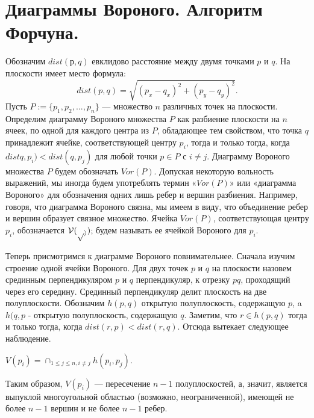 \section{Диаграммы Вороного. Алгоритм Форчуна. }

\begin{definition}
	Обозначим  $dist(р, q)$  евклидово  расстояние  между  двумя  точками $p$ и $q$.
	На  плоскости имеет место формула: $$dist(p, q) = \sqrt{(p_x-q_x)^2+(p_y-q_y)^2}.$$
	Пусть  $P  := \{p_1,  p_2, ..., p_n\}$  ---  множество  $n$  различных  точек  на  плоскости.
	Определим  диаграмму  Вороного  множества  $P$  как разбиение  плоскости  на  $n$  ячеек,  по  одной  для  каждого  центра  из  $P$,  обладающее тем  свойством,  что  точка  $q$  принадлежит  ячейке,  соответствующей  центру  $p_i$,  тогда и  только  тогда,  когда  $distq, p_i)  <  dist(q,  p_j)$  для  любой  точки  $p \in P$ с $i \not= j$.
	Диаграмму Вороного  множества  $P$  будем  обозначать  $Vor(P)$. 
	Допуская  некоторую  вольность выражений,  мы  иногда  будем  употреблять  термин  «$Vor(P)$»  или  «диаграмма  Вороного»  для  обозначения  одних  лишь  ребер  и  вершин  разбиения.
	Например,  говоря, что  диаграмма  Вороного  связна,  мы  имеем  в  виду,  что  объединение  ребер  и  вершин образует  связное  множество. 
	Ячейка  $Vor(P)$,  соответствующая  центру  $p_i$,  обозначается  $\cal V(p_i)$;  будем  называть  ее  ячейкой  Вороного  для  $p_i$.
\end{definition}

Теперь  присмотримся  к  диаграмме  Вороного  повнимательнее. 
Сначала  изучим строение  одной  ячейки  Вороного. 
Для  двух  точек  $p$  и  $q$  на  плоскости  назовем  срединным  перпендикуляром  $p$  и  $q$  перпендикуляр,  к  отрезку  $pq$,  проходящий  через его  середину. 
Срединный  перпендикуляр  делит  плоскость  на  две  полуплоскости. 
Обозначим  $h(p, q)$  открытую  полуплоскость,  содержащую  $p$,  a  $h(q, p$  -  открытую полуплоскость,  содержащую  $q$. 
Заметим,  что  $r \in h(p, q)$  тогда  и  только  тогда,  когда $dist(r,p)  <  dist(r,  q)$. 
Отсюда  вытекает  следующее  наблюдение.

\begin{observation}
	$V(p_i) = \cap_{1 \le j \le n, i \not= j} h(p_i, p_j)$.
\end{observation}

Таким  образом,  $V(p_i)$  ---  пересечение  $n  -  1$  полуплоскостей, а,  значит,  является  выпуклой  многоугольной  областью  (возможно,  неограниченной),  имеющей  не  более $n - 1$ вершин  и не  более $n - 1$  ребер.

